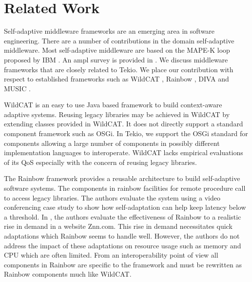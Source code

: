 \documentclass{acm_proc_article-sp}
\begin{document}
\section{Related Work}
\label{sec:relatedwork}

Self-adaptive middleware frameworks are an emerging area in software engineering. There are a number of contributions in the domain self-adaptive middleware. Most self-adaptive middleware are based on the MAPE-K loop proposed by IBM \cite{IBM2005}. An ampl survey is provided in \cite{villegas2011}. We discuss middleware frameworks that are closely related to Tekio. We place our contribution with respect to established frameworks such as WildCAT \cite{David2005}, Rainbow \cite{garlan2004}, DIVA \cite{Romero2010} and MUSIC \cite{Rouvoy2008}.

WildCAT \cite{David2005} is an easy to use Java based framework to build context-aware adaptive systems. Reusing legacy libraries may be achieved in WildCAT by extending classes provided in WildCAT. It does not directly support a standard component framework such as OSGi. In Tekio, we support the OSGi standard for components allowing a large number of components in possibly different implementation languages to interoperate.  WildCAT  lacks empirical evaluations of its QoS especially with the concern of reusing legacy libraries.

The Rainbow \cite{garlan2004} framework provides a reusable architecture to build self-adaptive software systems. The components in rainbow facilities for remote procedure call to access legacy libraries.   The authors evaluate the system using a video conferencing case study to show how self-adaptation can help keep latency below a threshold. In \cite{cheng2009}, the authors evaluate the effectiveness of Rainbow to a realistic rise in demand in a website Znn.com. This rise in demand necessitates quick adaptations which Rainbow seems to handle well. However, the authors do not address the impact of these adaptations on resource usage such as memory and CPU which are often limited. From an interoperability point of view  all components in Rainbow are specific to the framework and must be rewritten as Rainbow components much like WildCAT. 
\end{document}
